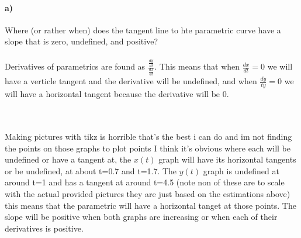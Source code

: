 \documentclass{report}
\begin{document}
\paragraph{a)} Where (or rather when) does the tangent line to hte parametric curve have a slope that is zero, undefined, and positive? \\ \\
Derivatives of parametrics are found as $ \frac{ \frac{ dy }{ dt }  }{ \frac{ dx }{ dt }  } $. This means that when $ \frac{ dx }{ dt } =0 $ we will have a verticle tangent and the derivative will be undefined, and when $ \frac{ dy }{ ty } =0 $ we will have a horizontal tangent because the derivative will be 0. \\ \\
\\ Making pictures with tikz is horrible that's the best i can do and im not finding the points on those graphs to plot points I think it's obvious where each will be undefined or have a tangent at, the $ x\left( t \right)  $ graph will have its horizontal tangents or be undefined, at about t=0.7 and t=1.7. The $ y\left( t \right)  $ graph is undefined at around t=1 and has a tangent at around t=4.5 (note non of these are to scale with the actual provided pictures they are just based on the estimations above) this means that the parametric will have a horizontal tanget at those points. The slope will be positive when both graphs are increasing or when each of their derivatives is positive. 
\end{document}
